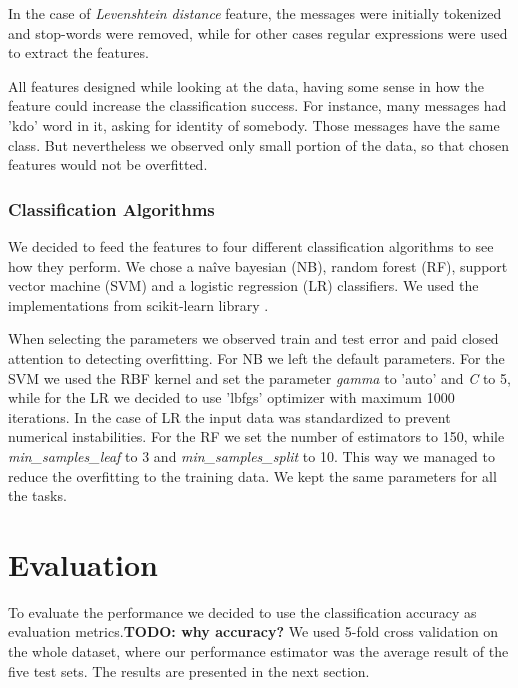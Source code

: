 \documentclass[11pt,a4paper]{article}
\begin{document}
In the case of \textit{Levenshtein distance} feature,  the messages were initially tokenized and stop-words \cite{sloStopWords} were removed, while for other cases regular expressions were used to extract the features.

All features designed while looking at the data, having some sense in how the feature could increase the classification success. For instance, many messages  had 'kdo' word in it, asking for identity of somebody. Those messages have the same class. But nevertheless we observed only small portion of the data, so that chosen features would not be overfitted.

\subsubsection{Classification Algorithms}
\label{sssc:class-alg}
We decided to feed the features to four different classification algorithms to see how they perform. We chose a na\^ive bayesian (NB), random forest (RF), support vector machine (SVM) and a logistic regression (LR) classifiers. We used the implementations from scikit-learn library \cite{scikit-learn}.

When selecting the parameters we observed train and test error and paid closed attention to detecting overfitting. For NB we left the default parameters. For the SVM we used the RBF kernel and set the parameter \textit{gamma} to 'auto' and \textit{C} to 5, while for the LR we decided to use 'lbfgs' optimizer with maximum 1000 iterations. In the case of LR the input data was standardized to prevent numerical instabilities. For the RF we set the number of estimators to 150, while \textit{min\_samples\_leaf} to 3 and \textit{min\_samples\_split} to 10. This way we managed to reduce the overfitting to the training data. We kept the same parameters for all the tasks.

\section{Evaluation}
To evaluate the performance we decided to use the classification accuracy as evaluation metrics.\textbf{TODO: why accuracy?} We used 5-fold cross validation on the whole dataset, where our performance estimator was the average result of the five test sets. The results are presented in the next section.
\end{document}
